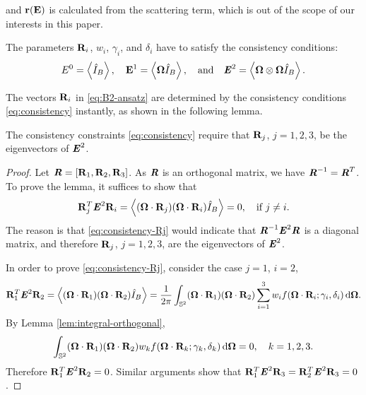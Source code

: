and $\mathbf{r}(\mathbf{E})$ is calculated from the scattering term, which is out of
the scope of our interests in this paper.

The parameters $\mathbf{R}_i$, $w_i$, $\gamma_i$, and $\delta_i$ have to satisfy the 
consistency conditions: 
\begin{equation}\label{eq:consistency}
  E^0 = \Vint{\bansatz}, \quad
  \bE^1 = \Vint{\bOmega \bansatz}, \quand
  \bbrE^2 = \Vint{\bOmega \otimes \bOmega \bansatz}.
\end{equation}

The vectors $\mathbf{R}_i$ in \eqref{eq:B2-ansatz} are determined by the consistency conditions
\eqref{eq:consistency} instantly, as shown in the following lemma. 
\begin{lemma}\label{lem:Rj}
  The consistency constraints \eqref{eq:consistency} require that
  $\mathbf{R}_j$, $j=1,2,3$, be the eigenvectors of $\boldsymbol{\mathit{E}}^2$.
\end{lemma}
\begin{proof}
  Let 
  $\boldsymbol{\mathit{R}} = \left[\mathbf{R}_1, \mathbf{R}_2, \mathbf{R}_3\right]$. As $\boldsymbol{\mathit{R}}$ is an orthogonal 
  matrix, we have $\boldsymbol{\mathit{R}}^{-1} = \boldsymbol{\mathit{R}}^T$. To prove the lemma, it suffices to show that
  \begin{equation}\label{eq:consistency-Rj}
    \bR_j^T\bbrE^2\bR_i = \Vint{(\bOmega\cdot\bR_j)
    (\bOmega\cdot\bR_i)\bansatz} = 0,\quad \text{if}~j\not=i.
  \end{equation}
  The reason is that \eqref{eq:consistency-Rj} would indicate that
  $\boldsymbol{\mathit{R}}^{-1}\boldsymbol{\mathit{E}}^2\boldsymbol{\mathit{R}}$ is a diagonal matrix, and therefore $\mathbf{R}_j$,
  $j=1,2,3$, are the eigenvectors of $\boldsymbol{\mathit{E}}^2$.
  
  In order to prove \eqref{eq:consistency-Rj}, consider the case $j=1$, $i=2$,
  \[
    \mathbf{R}_1^T\boldsymbol{\mathit{E}}^2\mathbf{R}_2  = \left\langle (\boldsymbol{\Omega}\cdot\mathbf{R}_1)
    (\boldsymbol{\Omega}\cdot\mathbf{R}_2) \hat I_B \right\rangle
    = \dfrac1{2\pi} \int_{\mathbb{S}^2} (\boldsymbol{\Omega}\cdot\mathbf{R}_1) (\boldsymbol{\Omega}\cdot\mathbf{R}_2) 
    \sum_{i = 1}^3 w_i f(\boldsymbol{\Omega}\cdot\mathbf{R}_i; 
    \gamma_i, \delta_i) \,{\rm d}\boldsymbol{\Omega}.
  \]
  By Lemma \ref{lem:integral-orthogonal},
  \[
    \int_{\mathbb{S}^2} (\boldsymbol{\Omega}\cdot\mathbf{R}_1) (\boldsymbol{\Omega}\cdot\mathbf{R}_2) 
    w_k f(\boldsymbol{\Omega}\cdot\mathbf{R}_k; \gamma_k, \delta_k)
    \,{\rm d}\boldsymbol{\Omega} = 0, \quad k = 1,2,3.
  \]
  Therefore $\mathbf{R}_1^T\boldsymbol{\mathit{E}}^2\mathbf{R}_2 = 0$. Similar arguments
  show that $\mathbf{R}_1^T\boldsymbol{\mathit{E}}^2\mathbf{R}_3 = \mathbf{R}_2^T\boldsymbol{\mathit{E}}^2\mathbf{R}_3 = 0$. 
\end{proof}

